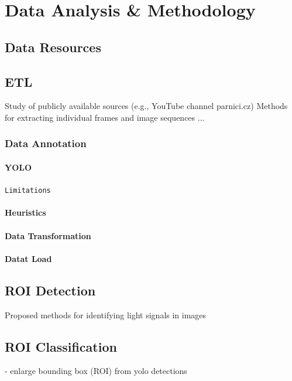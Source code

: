 \documentclass[english, ing, kiv, he, iso690alph, pdf, viewonly]{fasthesis}
\begin{document}
\chapter{Data Analysis \& Methodology}

\section{Data Resources}

\newpage
\section{ETL}


Study of publicly available sources (e.g., YouTube channel parnici.cz)
Methods for extracting individual frames and image sequences ... \cite{lin2015microsoft}

\subsection{Data Annotation}
\subsubsection{YOLO}

\texttt{Limitations}


\subsubsection{Heuristics}


\subsubsection{Data Transformation}


\subsubsection{Datat Load}


\newpage
\section{ROI Detection}

Proposed methods for identifying light signals in images




\section{ROI Classification}
- enlarge bounding box (ROI) from yolo detections
\end{document}
